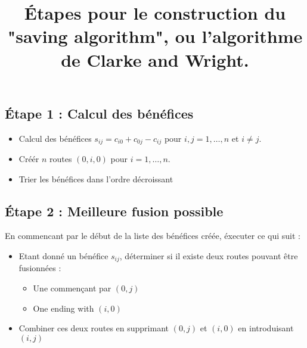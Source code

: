 \documentclass{article}
\title{Étapes pour le construction du "saving algorithm", ou l'algorithme de Clarke and Wright.}
\date{}
\begin{document}
\maketitle
\subsection*{Étape 1 : Calcul des bénéfices}
\begin{itemize}
    \item Calcul des bénéfices ${s_{ij}=c_{i0}+c_{0j}-c_{ij}}$ pour ${i,j=1,…,n}$ et ${i \neq j}$.
    \item Créér ${n}$ routes ${(0,i,0)}$ pour ${i=1,…,n}$.
    \item Trier les bénéfices dans l'ordre décroissant
\end{itemize}
\subsection*{Étape 2 : Meilleure fusion possible}
En commencant par le début de la liste des bénéfices créée, éxecuter ce qui suit :
\begin{itemize}
    \item Etant donné un bénéfice $s_{ij}$, déterminer si il existe deux routes pouvant être fusionnées : 
    \begin{itemize}
        \item Une commençant par $(0,j)$
        \item One ending with $(i,0)$
    \end{itemize}
    \item Combiner ces deux routes en supprimant $(0,j)$ et $(i,0)$ en introduisant $(i,j)$
\end{itemize}
 
\end{document}
